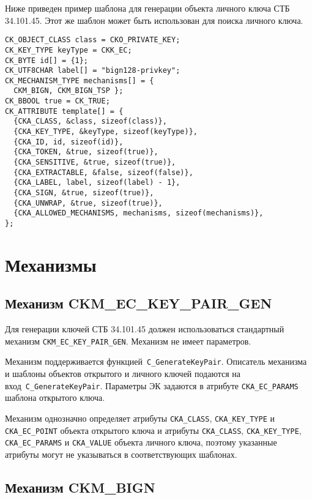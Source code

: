 
Ниже приведен пример шаблона для генерации объекта личного ключа СТБ 
34.101.45. Этот же шаблон может быть использован для поиска личного ключа.

\begin{verbatim}
CK_OBJECT_CLASS class = CKO_PRIVATE_KEY;
CK_KEY_TYPE keyType = CKK_EC;
CK_BYTE id[] = {1};
CK_UTF8CHAR label[] = "bign128-privkey";
CK_MECHANISM_TYPE mechanisms[] = {
  CKM_BIGN, CKM_BIGN_TSP };
CK_BBOOL true = CK_TRUE;
CK_ATTRIBUTE template[] = {
  {CKA_CLASS, &class, sizeof(class)},
  {CKA_KEY_TYPE, &keyType, sizeof(keyType)},
  {CKA_ID, id, sizeof(id)},
  {CKA_TOKEN, &true, sizeof(true)},
  {CKA_SENSITIVE, &true, sizeof(true)},
  {CKA_EXTRACTABLE, &false, sizeof(false)},
  {CKA_LABEL, label, sizeof(label) - 1},
  {CKA_SIGN, &true, sizeof(true)},
  {CKA_UNWRAP, &true, sizeof(true)},
  {CKA_ALLOWED_MECHANISMS, mechanisms, sizeof(mechanisms)},
};
\end{verbatim}

\section{Механизмы}
                                                                                                                 
\subsection{Механизм CKM\_EC\_KEY\_PAIR\_GEN}\label{CRYPTOKI.Gen}


Для генерации ключей СТБ 34.101.45 должен использоваться стандартный 
механизм \verb|CKM_EC_KEY_PAIR_GEN|. Механизм не имеет параметров. 

Механизм поддерживается функцией~\verb|C_GenerateKeyPair|. 
%
Описатель механизма и шаблоны объектов открытого и личного
ключей подаются на вход~\verb|C_GenerateKeyPair|. Параметры ЭК задаются в 
атрибуте \verb|CKA_EC_PARAMS| шаблона открытого ключа.

Механизм однозначно определяет атрибуты 
\verb|CKA_CLASS|, \verb|CKA_KEY_TYPE| и \verb|CKA_EC_POINT|
объекта открытого ключа и атрибуты
\verb|CKA_CLASS|, \verb|CKA_KEY_TYPE|, \verb|CKA_EC_PARAMS| и 
\verb|CKA_VALUE| объекта личного ключа,
поэтому указанные атрибуты могут не указываться в
соответствующих шаблонах.

\subsection{Механизм CKM\_BIGN}\label{CRYPTOKI.SignHSpec}

